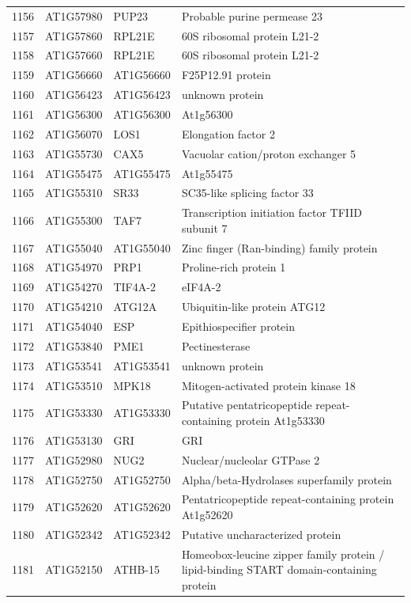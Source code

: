 \documentclass[11pt]{article}
\begin{document}
\begin{center}
\begin{tabular}{rlll}
1156 & AT1G57980 & PUP23 & Probable purine permease 23\\
1157 & AT1G57860 & RPL21E & 60S ribosomal protein L21-2\\
1158 & AT1G57660 & RPL21E & 60S ribosomal protein L21-2\\
1159 & AT1G56660 & AT1G56660 & F25P12.91 protein\\
1160 & AT1G56423 & AT1G56423 & unknown protein\\
1161 & AT1G56300 & AT1G56300 & At1g56300\\
1162 & AT1G56070 & LOS1 & Elongation factor 2\\
1163 & AT1G55730 & CAX5 & Vacuolar cation/proton exchanger 5\\
1164 & AT1G55475 & AT1G55475 & At1g55475\\
1165 & AT1G55310 & SR33 & SC35-like splicing factor 33\\
1166 & AT1G55300 & TAF7 & Transcription initiation factor TFIID subunit 7\\
1167 & AT1G55040 & AT1G55040 & Zinc finger (Ran-binding) family protein\\
1168 & AT1G54970 & PRP1 & Proline-rich protein 1\\
1169 & AT1G54270 & TIF4A-2 & eIF4A-2\\
1170 & AT1G54210 & ATG12A & Ubiquitin-like protein ATG12\\
1171 & AT1G54040 & ESP & Epithiospecifier protein\\
1172 & AT1G53840 & PME1 & Pectinesterase\\
1173 & AT1G53541 & AT1G53541 & unknown protein\\
1174 & AT1G53510 & MPK18 & Mitogen-activated protein kinase 18\\
1175 & AT1G53330 & AT1G53330 & Putative pentatricopeptide repeat-containing protein At1g53330\\
1176 & AT1G53130 & GRI & GRI\\
1177 & AT1G52980 & NUG2 & Nuclear/nucleolar GTPase 2\\
1178 & AT1G52750 & AT1G52750 & Alpha/beta-Hydrolases superfamily protein\\
1179 & AT1G52620 & AT1G52620 & Pentatricopeptide repeat-containing protein At1g52620\\
1180 & AT1G52342 & AT1G52342 & Putative uncharacterized protein\\
1181 & AT1G52150 & ATHB-15 & Homeobox-leucine zipper family protein / lipid-binding START domain-containing protein\\

\end{tabular}
\end{center}
\end{document}
